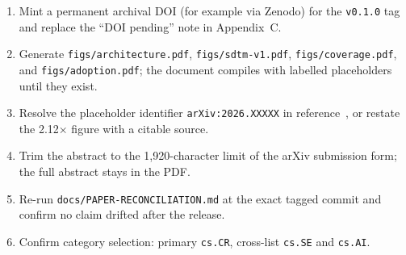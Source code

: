 \documentclass[11pt]{article}
\begin{document}
\begin{enumerate}[leftmargin=*,itemsep=2pt]
\item Mint a permanent archival DOI (for example via Zenodo) for the \texttt{v0.1.0} tag and replace the ``DOI pending'' note in Appendix~C.
\item Generate \texttt{figs/architecture.pdf}, \texttt{figs/sdtm-v1.pdf}, \texttt{figs/coverage.pdf}, and \texttt{figs/adoption.pdf}; the document compiles with labelled placeholders until they exist.
\item Resolve the placeholder identifier \texttt{arXiv:2026.XXXXX} in reference~\cite{companion-risk}, or restate the 2.12$\times$ figure with a citable source.
\item Trim the abstract to the 1{,}920-character limit of the arXiv submission form; the full abstract stays in the PDF.
\item Re-run \texttt{docs/PAPER-RECONCILIATION.md} at the exact tagged commit and confirm no claim drifted after the release.
\item Confirm category selection: primary \texttt{cs.CR}, cross-list \texttt{cs.SE} and \texttt{cs.AI}.
\end{enumerate}
\end{document}
